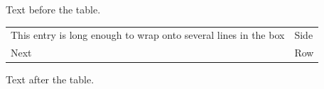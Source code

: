 \documentclass[12pt]{article}
\begin{document}
Text before the table.

\begin{tabular}{p{4cm}l}This entry is long enough to wrap onto several lines in the box & Side\\Next & Row\end{tabular}

Text after the table.
\end{document}
